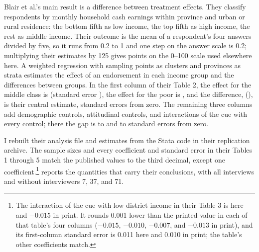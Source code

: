 \documentclass[11pt,letterpaper]{article}
\begin{document}
Blair et al.'s main result is a difference between treatment effects. They classify respondents by monthly household cash earnings within province and urban or rural residence: the bottom fifth as low income, the top fifth as high income, the rest as middle income. Their outcome is the mean of a respondent's four answers divided by five, so it runs from 0.2 to 1 and one step on the answer scale is 0.2; multiplying their estimates by 125 gives points on the 0--100 scale used elsewhere here. A weighted regression with sampling points as clusters and provinces as strata estimates the effect of an endorsement in each income group and the differences between groups. In the first column of their Table 2, the effect for the middle class is \BlairMiddleFull{} (standard error \BlairMiddleFullSE{}), the effect for the poor is \BlairLowFull{}, and the difference, \BlairGapFull{} (\BlairGapFullSE{}), is their central estimate, \BlairGapTFirstFull{} standard errors from zero. The remaining three columns add demographic controls, attitudinal controls, and interactions of the cue with every control; there the gap is \BlairGapControlsFullMin{} to \BlairGapControlsFullMax{} and \BlairGapTControlsFullMin{} to \BlairGapTControlsFullMax{} standard errors from zero.

I rebuilt their analysis file and estimates from the Stata code in their replication archive. The sample sizes and every coefficient and standard error in their Tables 1 through 5 match the published values to the third decimal, except one coefficient.\footnote{The interaction of the cue with low district income in their Table 3 is \BlairDistrictGapFull{} here and $-0.015$ in print. It rounds 0.001 lower than the printed value in each of that table's four columns ($-0.015$, $-0.010$, $-0.007$, and $-0.013$ in print), and its first-column standard error is 0.011 here and 0.010 in print; the table's other coefficients match.}  reports the quantities that carry their conclusions, with all interviews and without interviewers 7, 37, and 71.
\end{document}
